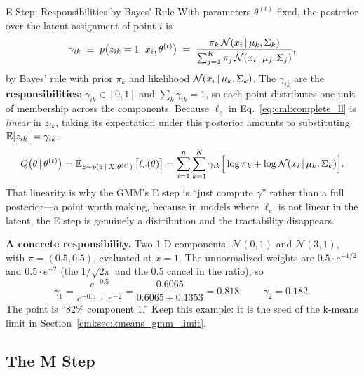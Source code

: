 \begin{mathresult}{E Step: Responsibilities by Bayes' Rule}
With parameters $\theta^{(t)}$ fixed, the posterior over the latent assignment of point $i$ is
\begin{equation}
\gamma_{ik} \;\equiv\; p\big(z_{ik} = 1 \,|\, x_i, \theta^{(t)}\big) \;=\; \frac{\pi_k \, \mathcal{N}(x_i \,|\, \mu_k, \Sigma_k)}{\sum_{j=1}^{K} \pi_j \, \mathcal{N}(x_i \,|\, \mu_j, \Sigma_j)},
\end{equation}
by Bayes' rule with prior $\pi_k$ and likelihood $\mathcal{N}(x_i \,|\, \mu_k, \Sigma_k)$. The $\gamma_{ik}$ are the \textbf{responsibilities}: $\gamma_{ik} \in [0,1]$ and $\sum_k \gamma_{ik} = 1$, so each point distributes one unit of membership across the components. Because $\ell_c$ in Eq.~\eqref{eq:cml:complete_ll} is \emph{linear} in $z_{ik}$, taking its expectation under this posterior amounts to substituting $\operatorname{\mathbb{E}}[z_{ik}] = \gamma_{ik}$:
\begin{equation}
Q\big(\theta \,|\, \theta^{(t)}\big) = \operatorname{\mathbb{E}}_{z \sim p(z \,|\, X, \theta^{(t)})}\big[\ell_c(\theta)\big] = \sum_{i=1}^n \sum_{k=1}^K \gamma_{ik}\Big[\log \pi_k + \log \mathcal{N}(x_i \,|\, \mu_k, \Sigma_k)\Big].
\end{equation}
That linearity is why the GMM's E step is ``just compute $\gamma$'' rather than a full posterior---a point worth making, because in models where $\ell_c$ is not linear in the latent, the E step is genuinely a distribution and the tractability disappears.
\end{mathresult}

\textbf{A concrete responsibility.} Two 1-D components, $\mathcal{N}(0,1)$ and $\mathcal{N}(3,1)$, with $\pi = (0.5, 0.5)$, evaluated at $x = 1$. The unnormalized weights are $0.5 \cdot e^{-1/2}$ and $0.5 \cdot e^{-2}$ (the $1/\sqrt{2\pi}$ and the $0.5$ cancel in the ratio), so
\begin{equation*}
\gamma_1 = \frac{e^{-0.5}}{e^{-0.5} + e^{-2}} = \frac{0.6065}{0.6065 + 0.1353} = 0.818, \qquad \gamma_2 = 0.182 .
\end{equation*}
The point is ``82\% component 1.'' Keep this example: it is the seed of the k-means limit in Section~\ref{cml:sec:kmeans_gmm_limit}.

\subsection{The M Step}

